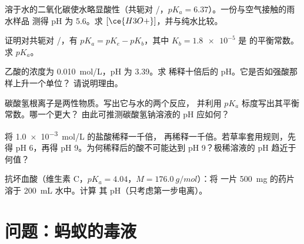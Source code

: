 \begin{exercise}[$\star\star$]\label{exo:g12:ka-and-pka:10}
溶于水的二氧化碳使水略显酸性（共轭对
/，$pK_a = 6.37$）。一份与空气接触的雨水样品
测得 pH 为 5.6。求 $[\ce{H3O+}]$，并与纯水比较。
\end{exercise}

\begin{exercise}[$\star\star$]\label{exo:g12:ka-and-pka:11}
证明对共轭对 /，有 $pK_a = pK_e - pK_b$，其中
$K_b = \num{1.8e-5}$ 是  的平衡常数。
求 $pK_a$。
\end{exercise}

\begin{exercise}[$\star\star\star$]\label{exo:g12:ka-and-pka:12}
乙酸的浓度为 \qty{0.010}{mol/L}，pH 为 3.39。求
稀释十倍后的 pH。它是否如强酸那样上升一个单位？
请说明理由。
\end{exercise}

\begin{exercise}[$\star\star\star$]\label{exo:g12:ka-and-pka:13}
碳酸氢根离子是两性物质。写出它与水的两个反应，
并利用 $pK_a$ 标度写出其平衡常数。哪一个更大？
由此可推测碳酸氢钠溶液的
pH 应如何？
\end{exercise}

\begin{exercise}[$\star\star\star$]\label{exo:g12:ka-and-pka:14}
将 \qty{1.0e-3}{mol/L} 的盐酸稀释一千倍，
再稀释一千倍。若草率套用规则，先得 pH 6，再得
pH 9。为何稀释后的酸不可能达到 pH 9？极稀溶液的
pH 趋近于何值？
\end{exercise}

\begin{exercise}[$\star\star\star$]\label{exo:g12:ka-and-pka:15}
抗坏血酸（维生素 C，$pK_a = 4.04$，$M = \qty{176.0}{g/mol}$）：将
一片 \qty{500}{mg} 的药片溶于 \qty{200}{mL} 水中。计算
其 pH（只考虑第一步电离）。
\end{exercise}

\section{问题：蚂蚁的毒液}


